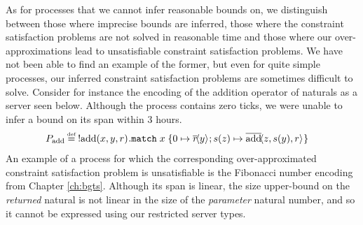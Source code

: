 As for processes that we cannot infer reasonable bounds on, we distinguish between those where imprecise bounds are inferred, those where the constraint satisfaction problems are not solved in reasonable time and those where our over-approximations lead to unsatisfiable constraint satisfaction problems. We have not been able to find an example of the former, but even for quite simple processes, our inferred constraint satisfaction problems are sometimes difficult to solve. Consider for instance the encoding of the addition operator of naturals as a server seen below. Although the process contains zero ticks, we were unable to infer a bound on its span within $3$ hours. 
\begin{align*}
    P_\text{add}\defeq&\;\bang\inputch{\text{add}}{x,y,r}{}{
        \texttt{match}\; x\; \{
             0 \mapsto \asyncoutputch{r}{y}{};
            \succc{z} \mapsto \asyncoutputch{\text{add}}{z,\succc{y},r}{}\}}
\end{align*}
An example of a process for which the corresponding over-approximated constraint satisfaction problem is unsatisfiable is the Fibonacci number encoding from Chapter \ref{ch:bgts}. Although its span is linear, the size upper-bound on the \textit{returned} natural is not linear in the size of the \textit{parameter} natural number, and so it cannot be expressed using our restricted server types.
%

% 
% 
% 
% 
% 